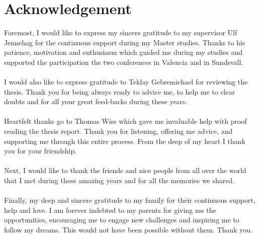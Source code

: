 \chapter{Acknowledgement}
\label{ch:acknowledgement}
Foremost, I would like to express my sincere gratitude to my supervisor Ulf Jennehag for the continuous support during my Master studies. 
Thanks to his patience, motivation and enthusiasm which guided me during my studies and supported the participation the two conferences in Valencia and in Sundsvall.
\\
\\
I would also like to express gratitude to Teklay Gebremichael for reviewing the thesis. Thank you for being always ready to advice me, to help me to clear doubts and for all your great feed-backs during these years.
\\
\\
Heartfelt thanks go to Thomas Wiss which gave me invaluable help with proof reading the thesis report. Thank you for listening, offering me advice, and supporting me through this entire process. 
From the deep of my  heart I thank you for your friendship.
\\
\\
Next, I would like to thank the friends and nice people from all over the world that I met during these amazing years and for all the memories we shared.
\\
\\
Finally, my deep and sincere gratitude to my family for their continuous support, help and love.
I am forever indebted to my parents for giving me the opportunities, encouraging me to engage new challenges and inspiring me to follow my dreams.
This would not have been possible without them.
Thank you.



